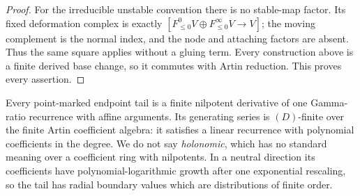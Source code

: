 \begin{proof}
For the irreducible unstable convention there is no stable-map factor.  Its
fixed deformation complex is exactly
\([F^0_{\leq0}V\oplus F^\infty_{\leq0}V\to V]\); the moving complement is
the normal index, and the node and attaching factors are absent.  Thus the
same square applies without a gluing term.  Every construction above is a
finite derived base change, so it commutes with Artin reduction.  This proves
every assertion.
\end{proof}

\begin{proposition}
\label{prop:clutching-tail-holonomicity}
Every point-marked endpoint tail is a finite nilpotent derivative of one
Gamma-ratio recurrence with affine arguments.  Its generating series is
\((D)\)-finite over the finite Artin coefficient algebra: it satisfies a linear
recurrence with polynomial coefficients in the degree.  We do not say
\emph{holonomic}, which has no standard meaning over a coefficient ring with
nilpotents.  In a neutral direction its coefficients have
polynomial-logarithmic growth after one exponential rescaling, so the tail
has radial boundary values which are distributions of finite order.
\end{proposition}

